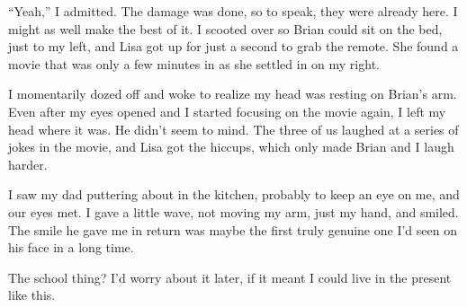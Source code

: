 ``Yeah,'' I admitted.  The damage was done, so to speak, they were already here.  I might as well make the best of it.  I scooted over so Brian could sit on the bed, just to my left, and Lisa got up for just a second to grab the remote.  She found a movie that was only a few minutes in as she settled in on my right.



I momentarily dozed off and woke to realize my head was resting on Brian's arm.  Even after my eyes opened and I started focusing on the movie again, I left my head where it was.  He didn't seem to mind.  The three of us laughed at a series of jokes in the movie, and Lisa got the hiccups, which only made Brian and I laugh harder.



I saw my dad puttering about in the kitchen, probably to keep an eye on me, and our eyes met.  I gave a little wave, not moving my arm, just my hand, and smiled.  The smile he gave me in return was maybe the first truly genuine one I'd seen on his face in a long time.



The school thing?  I'd worry about it later, if it meant I could live in the present like this.






